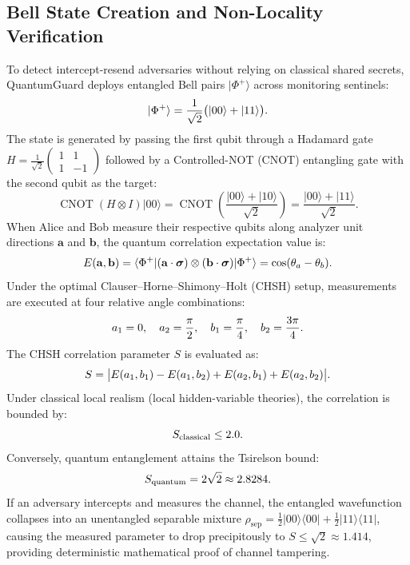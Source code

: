 \documentclass[journal,10pt]{IEEEtran}
\makeatletter
\let\orig@label\label
\def\label#1{%
  \orig@label{#1}%
  \pdfdest name{ref.#1} fith\relax
}
\makeatother
\begin{document}
\subsection{Bell State Creation and Non-Locality Verification}
To detect intercept-resend adversaries without relying on classical shared secrets, QuantumGuard deploys entangled Bell pairs $|\Phi^+\rangle$ across monitoring sentinels:
\begin{equation}
  |\Phi^+\rangle = \frac{1}{\sqrt{2}}\bigl(|00\rangle + |11\rangle\bigr).
  \label{eq:bell_state_form}
\end{equation}
The state is generated by passing the first qubit through a Hadamard gate $H = \frac{1}{\sqrt{2}}\begin{pmatrix} 1 & 1 \\ 1 & -1 \end{pmatrix}$ followed by a Controlled-NOT (CNOT) entangling gate with the second qubit as the target:
\begin{equation}
  \operatorname{CNOT}(H \otimes I)|00\rangle = \operatorname{CNOT}\left(\frac{|00\rangle + |10\rangle}{\sqrt{2}}\right) = \frac{|00\rangle + |11\rangle}{\sqrt{2}}.
\end{equation}
When Alice and Bob measure their respective qubits along analyzer unit directions $\mathbf{a}$ and $\mathbf{b}$, the quantum correlation expectation value is:
\begin{equation}
  E(\mathbf{a}, \mathbf{b}) = \langle \Phi^+ | (\mathbf{a}\cdot\boldsymbol{\sigma}) \otimes (\mathbf{b}\cdot\boldsymbol{\sigma}) | \Phi^+ \rangle = \cos(\theta_a - \theta_b).
  \label{eq:correlation_val}
\end{equation}
Under the optimal Clauser--Horne--Shimony--Holt (CHSH) setup, measurements are executed at four relative angle combinations:
\begin{equation}
  a_1 = 0, \quad a_2 = \frac{\pi}{2}, \quad b_1 = \frac{\pi}{4}, \quad b_2 = \frac{3\pi}{4}.
  \label{eq:chsh_angles_def}
\end{equation}
The CHSH correlation parameter $S$ is evaluated as:
\begin{equation}
  S = \bigl| E(a_1, b_1) - E(a_1, b_2) + E(a_2, b_1) + E(a_2, b_2) \bigr|.
  \label{eq:s_parameter}
\end{equation}
Under classical local realism (local hidden-variable theories), the correlation is bounded by:
\begin{equation}
  S_{\mathrm{classical}} \le 2.0.
  \label{eq:classical_bound}
\end{equation}
Conversely, quantum entanglement attains the Tsirelson bound:
\begin{equation}
  S_{\mathrm{quantum}} = 2\sqrt{2} \approx 2.8284.
  \label{eq:tsirelson_bound_def}
\end{equation}
If an adversary intercepts and measures the channel, the entangled wavefunction collapses into an unentangled separable mixture $\rho_{\mathrm{sep}} = \frac{1}{2}|00\rangle\langle 00| + \frac{1}{2}|11\rangle\langle 11|$, causing the measured parameter to drop precipitously to $S \le \sqrt{2} \approx 1.414$, providing deterministic mathematical proof of channel tampering.
\end{document}

